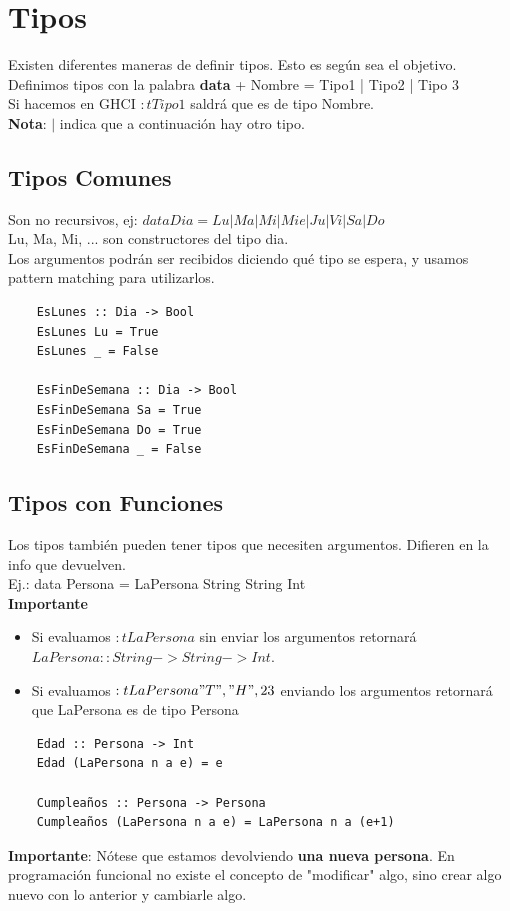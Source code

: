 \documentclass[10pt,a4paper]{article}
\begin{document}
\section*{Tipos}
Existen diferentes maneras de definir tipos. Esto es según sea el objetivo.
Definimos tipos con la palabra \textbf{data} + Nombre = Tipo1 | Tipo2 | Tipo 3 \\
Si hacemos en GHCI $:t Tipo1$ saldrá que es de tipo Nombre. \\
\textbf{Nota}: $|$ indica que a continuación hay otro tipo.
\subsection*{Tipos Comunes}
Son no recursivos, ej: $data Dia = Lu | Ma | Mi | Mie | Ju | Vi | Sa | Do $ \\
Lu, Ma, Mi, ... son constructores del tipo dia. \\
Los argumentos podrán ser recibidos diciendo qué tipo se espera, y usamos pattern matching para utilizarlos.
\begin{lstlisting}
    EsLunes :: Dia -> Bool
    EsLunes Lu = True 
    EsLunes _ = False 

    EsFinDeSemana :: Dia -> Bool
    EsFinDeSemana Sa = True 
    EsFinDeSemana Do = True 
    EsFinDeSemana _ = False 
\end{lstlisting}
\subsection*{Tipos con Funciones}
Los tipos también pueden tener tipos que necesiten argumentos. Difieren en la info que devuelven. \\
Ej.: data Persona = LaPersona String String Int \\
\textbf{Importante}
\begin{itemize}
    \item Si evaluamos $:t LaPersona$ sin enviar los argumentos retornará $LaPersona :: String -> String -> Int$. 
    \item Si evaluamos $:t LaPersona "T", "H", 23$ enviando los argumentos retornará que LaPersona es de tipo Persona
\end{itemize}
\begin{lstlisting}
    Edad :: Persona -> Int 
    Edad (LaPersona n a e) = e

    Cumpleaños :: Persona -> Persona 
    Cumpleaños (LaPersona n a e) = LaPersona n a (e+1)
\end{lstlisting}
\textbf{Importante}: Nótese que estamos devolviendo \textbf{una nueva persona}. En programación funcional no existe el concepto de "modificar" algo, sino crear algo nuevo con lo anterior y cambiarle algo.
\end{document}
